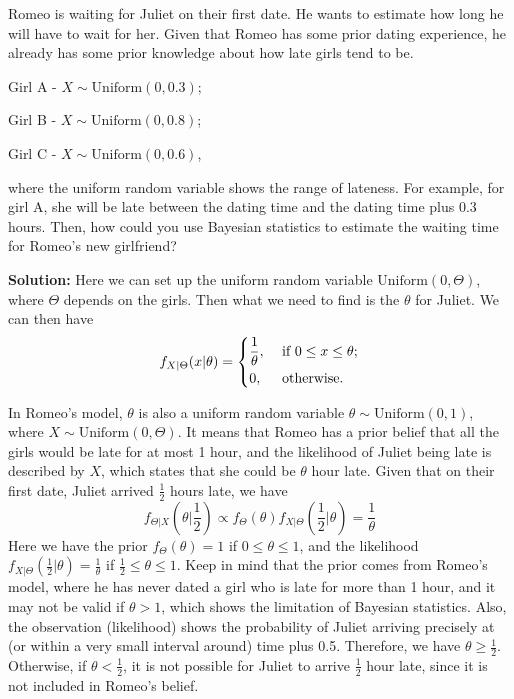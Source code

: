 \begin{eg}
  Romeo is waiting for Juliet on their first date. He wants to estimate how long he will have to wait for her. Given that Romeo has some prior dating experience, he already has some prior knowledge about how late girls tend to be.
  
  Girl A - \(X \sim \text{Uniform}(0, 0.3)\); 
  
  Girl B - \(X \sim \text{Uniform}(0, 0.8)\); 

  Girl C - \(X \sim \text{Uniform}(0, 0.6)\), 

  where the uniform random variable shows the range of lateness. For example, for girl A, she will be late between the dating time and the dating time plus 0.3 hours. Then, how could you use Bayesian statistics to estimate the waiting time for Romeo's new girlfriend? 

  \textbf{Solution:} 
  Here we can set up the uniform random variable \(\text{Uniform}(0, \Theta)\), where \(\Theta\) depends on the girls. Then what we need to find is the \(\theta\) for Juliet. We can then have 
  \[
    f_{X \vert \Theta}(x \vert \theta) = \begin{dcases}
      \frac{1}{\theta}, &\text{ if } 0 \leq x \leq \theta ;\\
      0, &\text{ otherwise} .
    \end{dcases}
  \]

  In Romeo's model, \(\theta\) is also a uniform random variable \(\theta \sim \text{Uniform}(0, 1)\), where \(X \sim \text{Uniform}(0, \Theta)\). It means that Romeo has a prior belief that all the girls would be late for at most 1 hour, and the likelihood of Juliet being late is described by \(X\), which states that she could be \(\theta\) hour late. Given that on their first date, Juliet arrived \(\frac{1}{2}\) hours late, we have 
  \[
    f_{\Theta \vert X} (\theta \vert \dfrac{1}{2}) \propto f_\Theta (\theta) f_{X \vert \Theta}(\dfrac{1}{2} \vert \theta) = \dfrac{1}{\theta}
  \]
  Here we have the prior \(f_\Theta(\theta) = 1\) if \(0 \leq \theta \leq 1\), and the likelihood \(f_{X \vert \Theta} (\frac{1}{2} \vert \theta) = \frac{1}{\theta}\) if \(\frac{1}{2} \leq \theta \leq 1\). Keep in mind that the prior comes from Romeo's model, where he has never dated a girl who is late for more than 1 hour, and it may not be valid if \(\theta > 1\), which shows the limitation of Bayesian statistics. Also, the observation (likelihood) shows the probability of Juliet arriving precisely at (or within a very small interval around) time plus 0.5. Therefore, we have \(\theta \geq \frac{1}{2}\). Otherwise, if \(\theta < \frac{1}{2}\), it is not possible for Juliet to arrive \(\frac{1}{2}\) hour late, since it is not included in Romeo's belief. 


\end{eg}
